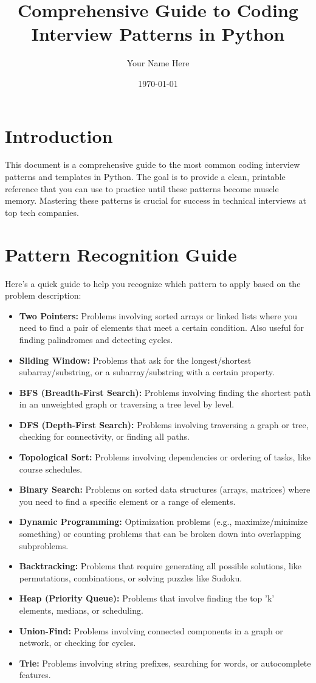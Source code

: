 \documentclass[11pt, a4paper]{article}
\title{Comprehensive Guide to Coding Interview Patterns in Python}
\author{Your Name Here}
\date{\today}
\begin{document}
\maketitle
\tableofcontents
\newpage

\section{Introduction}
This document is a comprehensive guide to the most common coding interview patterns and templates in Python. The goal is to provide a clean, printable reference that you can use to practice until these patterns become muscle memory. Mastering these patterns is crucial for success in technical interviews at top tech companies.

\section{Pattern Recognition Guide}
Here's a quick guide to help you recognize which pattern to apply based on the problem description:

\begin{itemize}
    \item \textbf{Two Pointers:} Problems involving sorted arrays or linked lists where you need to find a pair of elements that meet a certain condition. Also useful for finding palindromes and detecting cycles.
    \item \textbf{Sliding Window:} Problems that ask for the longest/shortest subarray/substring, or a subarray/substring with a certain property.
    \item \textbf{BFS (Breadth-First Search):} Problems involving finding the shortest path in an unweighted graph or traversing a tree level by level.
    \item \textbf{DFS (Depth-First Search):} Problems involving traversing a graph or tree, checking for connectivity, or finding all paths.
    \item \textbf{Topological Sort:} Problems involving dependencies or ordering of tasks, like course schedules.
    \item \textbf{Binary Search:} Problems on sorted data structures (arrays, matrices) where you need to find a specific element or a range of elements.
    \item \textbf{Dynamic Programming:} Optimization problems (e.g., maximize/minimize something) or counting problems that can be broken down into overlapping subproblems.
    \item \textbf{Backtracking:} Problems that require generating all possible solutions, like permutations, combinations, or solving puzzles like Sudoku.
    \item \textbf{Heap (Priority Queue):} Problems that involve finding the top 'k' elements, medians, or scheduling.
    \item \textbf{Union-Find:} Problems involving connected components in a graph or network, or checking for cycles.
    \item \textbf{Trie:} Problems involving string prefixes, searching for words, or autocomplete features.
\end{itemize}
\end{document}
